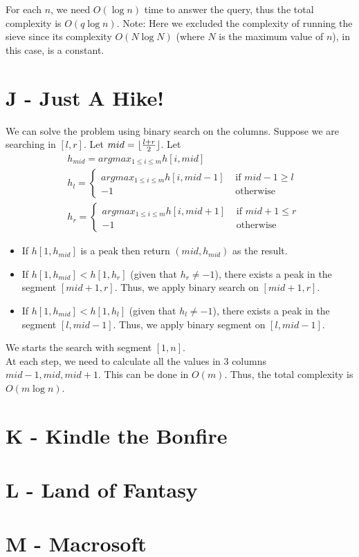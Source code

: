 \documentclass{article}
\DeclarePairedDelimiter\floor{\lfloor}{\rfloor}
\begin{document}
For each $n$, we need $O(\log{n})$ time to answer the query, thus the total complexity is $O(q\log{n})$. Note: Here we excluded
the complexity of running the sieve since its complexity $O(N\log{N})$ (where $N$ is the maximum value of $n$), in this case, is
a constant.

\section*{J - Just A Hike!}
We can solve the problem using binary search on the columns. Suppose we are searching in $[l, r]$. 
Let $mid = \floor{\frac{l + r}{2}}$. Let 
\begin{equation}
\begin{split}
&h_{mid} = argmax_{1 \leq i \leq m} h[i, mid]\\
&h_l = 
\begin{cases}
argmax_{1 \leq i \leq m} h[i, mid - 1] & \text{ if $mid - 1 \geq l$}\\
-1 & \text{ otherwise}
\end{cases}\\
&h_r = 
\begin{cases}
argmax_{1 \leq i \leq m} h[i, mid + 1] & \text{ if $mid + 1 \leq r$}\\
-1 & \text{ otherwise}
\end{cases}
\end{split}
\end{equation}
\begin{itemize}
\item
If $h[1, h_{mid}]$ is a peak then return $(mid, h_{mid})$ as the result.
\item
If $h[1, h_{mid}] < h[1, h_r]$ (given that $h_r \neq -1$), there exists a peak in the segment $[mid + 1, r]$. Thus,
we apply binary search on $[mid + 1, r]$.
\item
If $h[1, h_{mid}] < h[1, h_l]$ (given that $h_l \neq -1$), there exists a peak in the segment $[l, mid - 1]$. Thus, we apply binary segment on $[l, mid - 1]$.
\end{itemize}
We starts the search with segment $[1, n]$.\\

\noindent At each step, we need to calculate all the values in $3$ columns $mid - 1, mid, mid + 1$. This can be done in $O(m)$. Thus, the total complexity is $O(m\log{n})$.

\section*{K - Kindle the Bonfire}



\section{L - Land of Fantasy}



\section{M - Macrosoft}
\end{document}

